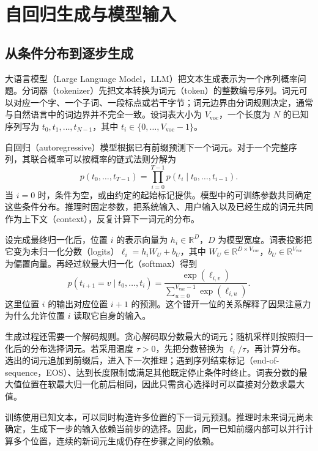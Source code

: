 \section{自回归生成与模型输入}
\label{l12:sec:tokens}

\subsection{从条件分布到逐步生成}

大语言模型（Large Language Model，LLM）把文本生成表示为一个序列概率问题。分词器（tokenizer）先把文本转换为词元（token）的整数编号序列。词元可以对应一个字、一个子词、一段标点或若干字节；词元边界由分词规则决定，通常与自然语言中的词边界并不完全一致。设词表大小为 $V_{\mathrm{voc}}$，一个长度为 $N$ 的已知序列写为 $t_0,t_1,\ldots,t_{N-1}$，其中 $t_i\in\{0,\ldots,V_{\mathrm{voc}}-1\}$。

自回归（autoregressive）模型根据已有前缀预测下一个词元。对于一个完整序列，其联合概率可以按概率的链式法则分解为
\begin{equation}
  p(t_0,\ldots,t_{T-1})
  =\prod_{i=0}^{T-1}p(t_i\mid t_0,\ldots,t_{i-1}).
  \label{l12:eq:autoregressive}
\end{equation}
当 $i=0$ 时，条件为空，或由约定的起始标记提供。模型中的可训练参数共同确定这些条件分布。推理时固定参数，把系统输入、用户输入以及已经生成的词元共同作为上下文（context），反复计算下一词元的分布。

设完成最终归一化后，位置 $i$ 的表示向量为 $h_i\in\mathbb{R}^D$，$D$ 为模型宽度。词表投影把它变为未归一化分数（logits）$\ell_i=h_iW_U+b_U$，其中 $W_U\in\mathbb{R}^{D\times V_{\mathrm{voc}}}$，$b_U\in\mathbb{R}^{V_{\mathrm{voc}}}$ 为偏置向量。再经过软最大归一化（softmax）得到
\begin{equation}
  p(t_{i+1}=v\mid t_0,\ldots,t_i)
  =\frac{\exp(\ell_{i,v})}
  {\sum_{u=0}^{V_{\mathrm{voc}}-1}\exp(\ell_{i,u})}.
  \label{l12:eq:vocab-softmax}
\end{equation}
这里位置 $i$ 的输出对应位置 $i+1$ 的预测。这个错开一位的关系解释了因果注意力为什么允许位置 $i$ 读取它自身的输入。

生成过程还需要一个解码规则。贪心解码取分数最大的词元；随机采样则按照归一化后的分布选择词元。若采用温度 $\tau>0$，先把分数替换为 $\ell_i/\tau$，再计算分布。选出的词元追加到前缀后，进入下一次推理；遇到序列结束标记（end-of-sequence，EOS）、达到长度限制或满足其他既定停止条件时终止。词表分数的最大值位置在软最大归一化前后相同，因此只需贪心选择时可以直接对分数求最大值。

训练使用已知文本，可以同时构造许多位置的下一词元预测。推理时未来词元尚未确定，生成下一步的输入依赖当前步的选择。因此，同一已知前缀内部可以并行计算多个位置，连续的新词元生成仍存在步骤之间的依赖。

